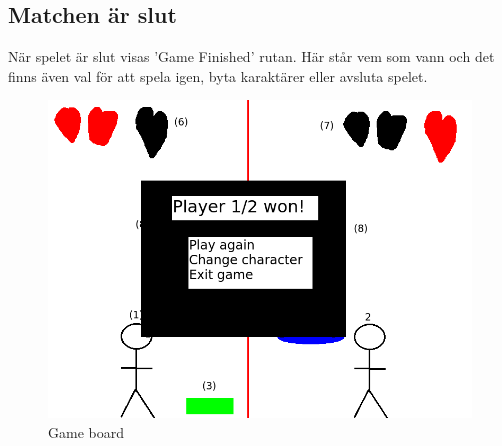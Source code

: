 \documentclass{TDP003mall}
\begin{document}
\subsection{Matchen är slut}
När spelet är slut visas 'Game Finished' rutan. Här står vem som vann och det finns även val för att spela igen, byta karaktärer eller avsluta spelet.
\begin{figure}[H]
    \centering
    \includegraphics[width = \linewidth]{gamefinished.png}
    \caption{Game board}
    \label{fig:Game board}
\end{figure}

\newpage
\end{document}
